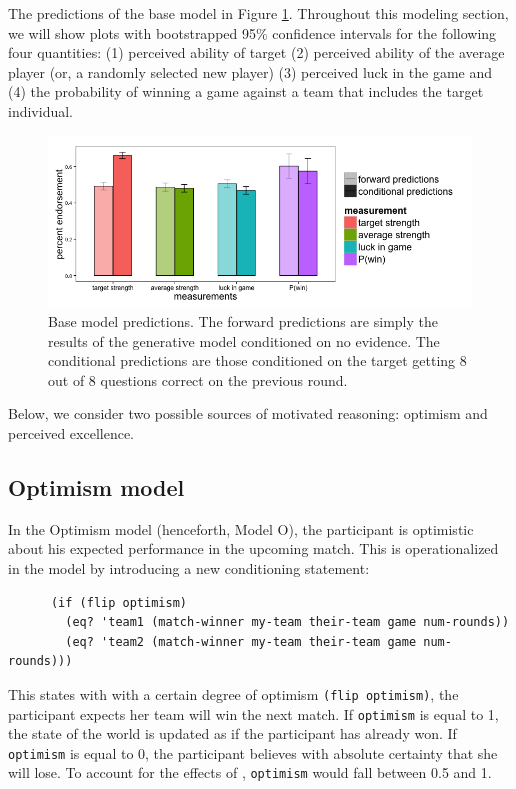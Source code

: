 \documentclass{article}
\begin{document}
The predictions of the base model in Figure \ref{fig:base}. Throughout this modeling section, we will show plots with bootstrapped 95\% confidence intervals for the following four quantities: (1) perceived ability of target (2) perceived ability of the average player (or, a randomly selected new player) (3) perceived luck in the game and (4) the probability of winning a game against a team that includes the target individual. 

\begin{figure}
\centering
    \includegraphics[width=\columnwidth]{basePredictions2}
    \caption{Base model predictions. The forward predictions are simply the results of the generative model conditioned on no evidence. The conditional predictions are those conditioned on the target getting 8 out of 8 questions correct on the previous round.}
      \label{fig:base}
\end{figure}


Below, we consider two possible sources of motivated reasoning: optimism and perceived excellence. 
\subsection{Optimism model}

In the Optimism model (henceforth, Model O), the participant is optimistic about his expected performance in the upcoming match. This is operationalized in the model by introducing a new conditioning statement: 

\begin{lstlisting}
      (if (flip optimism) 
        (eq? 'team1 (match-winner my-team their-team game num-rounds)) 
        (eq? 'team2 (match-winner my-team their-team game num-rounds)))
\end{lstlisting}

This states with with a certain degree of optimism \lstinline{(flip optimism)}, the participant expects her team will win the next match. If \lstinline{optimism} is equal to 1, the state of the world is updated as if the participant has already won. If  \lstinline{optimism} is equal to 0, the participant believes with absolute certainty that she will lose. To account for the effects of \citet{Klein1992}, \lstinline{optimism} would fall between 0.5 and 1. 
\end{document}
